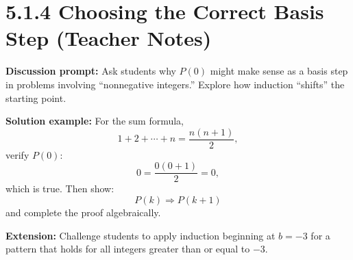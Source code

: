 \section*{5.1.4 Choosing the Correct Basis Step (Teacher Notes)}

\textbf{Discussion prompt:}
Ask students why $P(0)$ might make sense as a basis step in problems involving
“nonnegative integers.” Explore how induction “shifts” the starting point.

\textbf{Solution example:}
For the sum formula,
\[
1 + 2 + \cdots + n = \frac{n(n+1)}{2},
\]
verify $P(0)$:
\[
0 = \frac{0(0+1)}{2} = 0,
\]
which is true. Then show:
\[
P(k) \Rightarrow P(k+1)
\]
and complete the proof algebraically.

\textbf{Extension:}
Challenge students to apply induction beginning at $b=-3$ for a pattern that
holds for all integers greater than or equal to $-3$.

